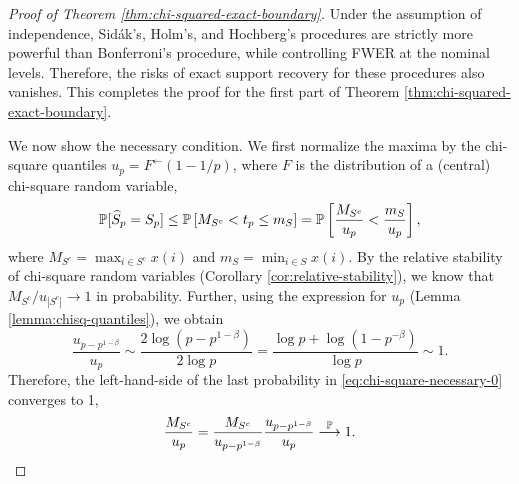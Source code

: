 \begin{proof}[Proof of Theorem \ref{thm:chi-squared-exact-boundary}]
Under the assumption of independence, Sid\'ak's, Holm's, and Hochberg's procedures are strictly more powerful than Bonferroni's procedure, while controlling FWER at the nominal levels.
Therefore, the risks of exact support recovery for these procedures also vanishes.
This completes the proof for the first part of Theorem \ref{thm:chi-squared-exact-boundary}.

We now show the necessary condition. 
We first normalize the maxima by the chi-square quantiles $u_p = F^{\leftarrow}(1-1/p)$, where $F$ is the distribution of a (central) chi-square random variable,
\begin{equation} \label{eq:chi-square-necessary-0}
 \P[\widehat{S}_p = S_p] \le \P\left[M_{S^c} <  t_p \le m_{S} \right]
  = \P\left[ \frac{M_{S^c}}{u_p} < \frac{m_S}{u_p} \right],
\end{equation}
where $M_{S^c} = \max_{i\in S^c}x(i)$ and $m_{S} = \min_{i\in S}x(i)$.
By the relative stability of chi-square random variables (Corollary \ref{cor:relative-stability}), we know that ${M_{S^c}}/{u_{|S^c|}}\to1$ in probability. 
Further, using the expression for $u_p$ (Lemma \ref{lemma:chisq-quantiles}), we obtain
$$
\frac{u_{p-p^{1-\beta}}}{u_{p}} \sim \frac{2\log{(p-p^{1-\beta})}}{2\log{p}} = \frac{\log{p}+\log{(1-p^{-\beta})}}{\log{p}} \sim 1.
$$
Therefore, the left-hand-side of the last probability in \eqref{eq:chi-square-necessary-0} converges to 1,
\begin{equation} \label{eq:chi-square-necessary-1}
    \frac{M_{S^c}}{u_{p}} = \frac{M_{S^c}}{u_{p-p^{1-\beta}}} \frac{u_{p-p^{1-\beta}}}{u_{p}} \stackrel{\P}{\longrightarrow} 1.
\end{equation}


\end{proof}
